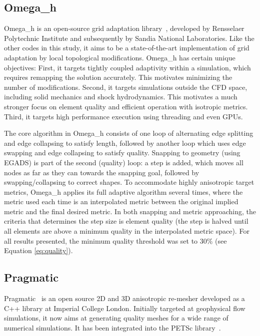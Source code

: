 \documentclass[3p,times,procedia,number]{elsarticle}
\begin{document}
\subsection{Omega\_h}

Omega\_h is an open-source grid adaptation library~\cite{ibanez-phd-thesis-heterogeneous-adapt,%
ibanez-shephard-moving-shared-mem,%
omega_h-website}, developed by Rensselaer Polytechnic Institute
and subsequently by Sandia National Laboratories.
Like the other codes in this study, it aims to be a state-of-the-art
implementation of grid adaptation by local topological modifications.
Omega\_h has certain unique objectives:
First, it targets tightly coupled adaptivity within a simulation,
which requires remapping the solution accurately.
This motivates minimizing the number of modifications.
Second, it targets simulations outside the CFD space, including
solid mechanics and shock hydrodynamics.
This motivates a much stronger focus on element quality
and efficient operation with isotropic metrics.
Third, it targets high performance execution using threading
and even GPUs.

The core algorithm in Omega\_h consists of one loop of alternating
edge splitting and edge collapsing to satisfy length, followed by another loop
which uses edge swapping and edge collapsing to satisfy quality.
Snapping to geometry (using EGADS) is part of the second (quality) loop:
a step is added, which moves all nodes as far as they can towards
the snapping goal, followed by swapping/collapsing to correct shapes.
To accommodate highly anisotropic target metrics, Omega\_h applies
its full adaptive algorithm several times, where the metric used
each time is an interpolated metric between the original implied metric
and the final desired metric.
In both snapping and metric approaching, the criteria that determines
the step size is element quality (the step is halved until all elements
are above a minimum quality in the interpolated metric space).
For all results presented, the minimum quality threshold was set to 30\%
(see Equation \ref{eq:quality}).

\subsection{Pragmatic}

Pragmatic~\cite{pragmatic-website,Gorman-2015} is an open source 2D and
3D anisotropic re-mesher developed as a C++ library at Imperial College
London.
Initially targeted at geophysical flow simulations, it now
aims at generating quality meshes for a wide range of numerical
simulations.
It has been integrated into the PETSc library~\cite{petsc-user-ref,Barral-2016}.
\end{document}
